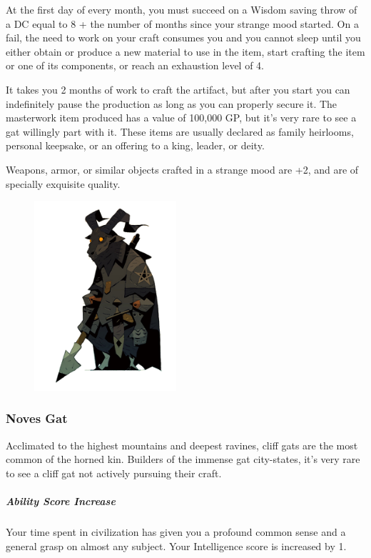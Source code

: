 \begin{linenumbers}
At the first day of every month, you must succeed on a Wisdom saving throw of a DC equal to 8 + the number of months since your strange mood started.
On a fail, the need to work on your craft consumes you and you cannot sleep until you either obtain or produce a new material to use in the item, start crafting the item or one of its components, or reach an exhaustion level of 4.

It takes you 2 months of work to craft the artifact, but after you start you can indefinitely pause the production as long as you can properly secure it.
The masterwork item produced has a value of 100,000 GP, but it's very rare to see a gat willingly part with it.
These items are usually declared as family heirlooms, personal keepsake, or an offering to a king, leader, or deity.

Weapons, armor, or similar objects crafted in a strange mood are +2, and are of specially exquisite quality.

\begin{figure}[!b]
    \centering
    \includegraphics[width=0.47\textwidth]{02kins/img/11gat_knight.png}
\end{figure}

\newpage

\subsubsection{Noves Gat}
Acclimated to the highest mountains and deepest ravines, cliff gats are the most common of the horned kin.
Builders of the immense gat city-states, it's very rare to see a cliff gat not actively pursuing their craft.

\subparagraph{Ability Score Increase} Your time spent in civilization has given you a profound common sense and a general grasp on almost any subject.
Your Intelligence score is increased by 1.


\end{linenumbers}
